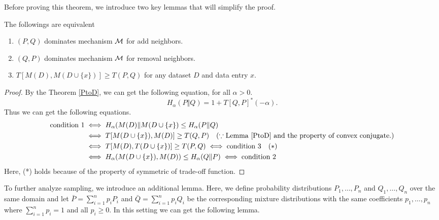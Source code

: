 \documentclass{article}
\begin{document}
Before proving this theorem, we introduce two key lemmas that will simplify the proof.

\begin{lemma}\label{samplinglemma1}
    The followings are equivalent
    \begin{enumerate}
        \item $(P,Q)$ dominates mechanism ${\mathcal{M}}$ for add neighbors.
        \item $(Q,P)$ dominates mechanism ${\mathcal{M}}$ for removal neighbors.
        \item $T[M(D),M(D\cup \{x\})] \ge T(P,Q)$ for any dataset $D$ and data entry $x$.
    \end{enumerate}

    \begin{proof}
        By the Theorem \ref{PtoD}, we can get the following equation, for all $\alpha >0$.
        \begin{equation*}
            H_\alpha(P\Vert Q) = 1+T[Q,P]^*(-\alpha).
        \end{equation*}
        Thus we can get the following equations.
        \begin{align*}
            \text{condition 1} &\iff H_\alpha(M(D) \Vert M(D \cup \{x\}) \le H_\alpha(P\Vert Q)\\
            &\iff T[M(D \cup \{x\}),M(D)] \ge T(Q,P) \quad (\because \text{Lemma \ref{PtoD} and the property of convex conjugate.})\\
            &\iff T[M(D), T(D\cup \{x\})] \ge T(P,Q) \iff \text{condition 3}\quad(*)\\
            &\iff H_\alpha(M(D \cup \{x\}),M(D)) \le H_\alpha(Q\Vert P) \iff \text{condition 2}
        \end{align*}
        Here, (*) holds because of the property of symmetric of trade-off function.
    \end{proof}
\end{lemma}
To further analyze sampling, we introduce an additional lemma. Here, we define probability distributions $P_1, \dots, P_n$ and $Q_1, \dots, Q_n$ over the same domain and let $\bar{P} = \sum^n_{i=1}p_iP_i$ and $\bar{Q} = \sum^n_{i=1}p_iQ_i$ be the corresponding mixture distributions with the same coefficients $p_1,\dots, p_n$ where $\sum^n_{i=1}p_i = 1$ and all $p_i \ge 0$. In this setting we can get the following lemma.
\end{document}
